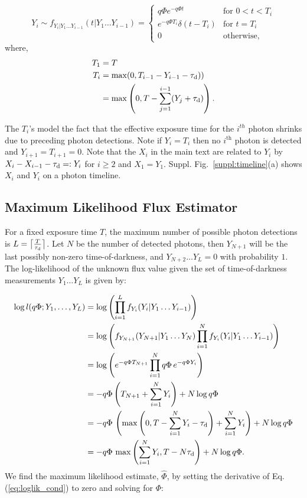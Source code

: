 \begin{equation}
Y_{i} \sim f_{Y_i | Y_{1}\dots Y_{i-1}}(t | Y_{1}\dots Y_{i-1})=\begin{cases}
q\Phi e^{-q\Phi t} & \mbox{for } 0< t < T_i\\
e^{-q\Phi T_i} \delta(t-T_i) &\mbox{for } t=T_i\\
0 & \mbox{otherwise,}
\end{cases} \label{eq:interarrival_distr}
\end{equation}
where,
\begin{align}
T_1 &=T\nonumber\\
T_i &= \max(0,T_{i-1} - Y_{i-1}-\tau_\text{d}))\nonumber\\
 &=\max\left(0,T -\sum^{i-1}_{j=1}(Y_j+\tau_\text{d})\right).
\end{align}

The $T_i$'s model the fact that the effective exposure time for the $i^{th}$
photon shrinks due to preceding photon detections. Note if $Y_i = T_i$ then no
$i^\text{th}$ photon is detected and $Y_{i+1}=T_{i+1}=0$. Note that the $X_i$
in the main text are related to $Y_i$ by $X_i-X_{i-1}-\tau_\text{d}=:Y_i$ for $i\geq2$
and $X_1=Y_1$. Suppl.  Fig.~\ref{suppl:timeline}(a) shows  $X_i$ and $Y_i$ on a
photon timeline.

\subsection*{Maximum Likelihood Flux Estimator}
For a fixed exposure time $T$, the maximum number of possible photon detections
is $L=\big\lceil\frac{T}{\tau_\text{d}}\big\rceil$. Let $N$ be the number of detected
photons, then $Y_{N+1}$ will be the last possibly non-zero time-of-darkness,
and $Y_{N+2}\dots Y_L =0$ with probability $1$. The log-likelihood of the
unknown flux value given the set of time-of-darkness measurements $Y_1\dots
Y_L$ is given by:

\begin{align}
  \log l(q\Phi; Y_1,\ldots,Y_{L}) &= \log \left( \prod_{i=1}^{L} f_{Y_{i}}(Y_i | Y_{1}\dots Y_{i-1}) \right) \nonumber \\
  &= \log \left(f_{Y_{N+1}}(Y_{N+1} | Y_{1}\dots Y_{N}) \prod_{i=1}^{N} f_{Y_{i}}(Y_i | Y_{1}\dots Y_{i-1}) \right) \nonumber \\
  &= \log \left( e^{-q\Phi T_{N+1}}\prod_{i=1}^{N} q\Phi\,e^{-q\Phi Y_i} \right) \nonumber \\
  &= - q\Phi \left( T_{N+1}+\sum_{i=1}^{N}Y_i \right) + N\log q\Phi \nonumber \\
  &= - q\Phi\,\left( \max\left(0,T-\sum_{i=1}^{N}Y_i-\tau_\text{d}\right)+\sum_{i=1}^{N}Y_i\right) + N \log q\Phi\nonumber\\
  &= - q\Phi\, \max\left(\sum_{i=1}^{N}Y_i,T-N\tau_\text{d}\right) + N \log q\Phi.
  \label{eq:loglik_cond}
\end{align}
We find the maximum likelihood estimate, $\widehat{\Phi}$, by setting the
derivative of Eq.(\ref{eq:loglik_cond}) to zero and solving for $\Phi$:

